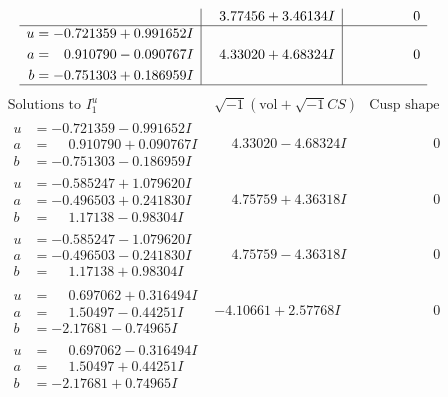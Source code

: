 \documentclass[1p]{elsarticle_modified}
\theoremstyle{definition}
\newcommand{\I}{\sqrt{-1}}
\begin{document}
$$\begin{array}{c|c|c}
 & \phantom{-}3.77456 + 3.46134 I & \phantom{-0.000000 } 0 \\ \hline\begin{aligned}
u &= -0.721359 + 0.991652 I \\
a &= \phantom{-}0.910790 - 0.090767 I \\
b &= -0.751303 + 0.186959 I\end{aligned}
 & \phantom{-}4.33020 + 4.68324 I & \phantom{-0.000000 } 0\\
 \hline 
 \end{array}$$\newpage$$\begin{array}{c|c|c}  
\text{Solutions to }I^u_{1}& \I (\text{vol} + \sqrt{-1}CS) & \text{Cusp shape}\\
 \hline 
\begin{aligned}
u &= -0.721359 - 0.991652 I \\
a &= \phantom{-}0.910790 + 0.090767 I \\
b &= -0.751303 - 0.186959 I\end{aligned}
 & \phantom{-}4.33020 - 4.68324 I & \phantom{-0.000000 } 0 \\ \hline\begin{aligned}
u &= -0.585247 + 1.079620 I \\
a &= -0.496503 + 0.241830 I \\
b &= \phantom{-}1.17138 - 0.98304 I\end{aligned}
 & \phantom{-}4.75759 + 4.36318 I & \phantom{-0.000000 } 0 \\ \hline\begin{aligned}
u &= -0.585247 - 1.079620 I \\
a &= -0.496503 - 0.241830 I \\
b &= \phantom{-}1.17138 + 0.98304 I\end{aligned}
 & \phantom{-}4.75759 - 4.36318 I & \phantom{-0.000000 } 0 \\ \hline\begin{aligned}
u &= \phantom{-}0.697062 + 0.316494 I \\
a &= \phantom{-}1.50497 - 0.44251 I \\
b &= -2.17681 - 0.74965 I\end{aligned}
 & -4.10661 + 2.57768 I & \phantom{-0.000000 } 0 \\ \hline\begin{aligned}
u &= \phantom{-}0.697062 - 0.316494 I \\
a &= \phantom{-}1.50497 + 0.44251 I \\
b &= -2.17681 + 0.74965 I\end{aligned}

\end{array}$$
\end{document}
